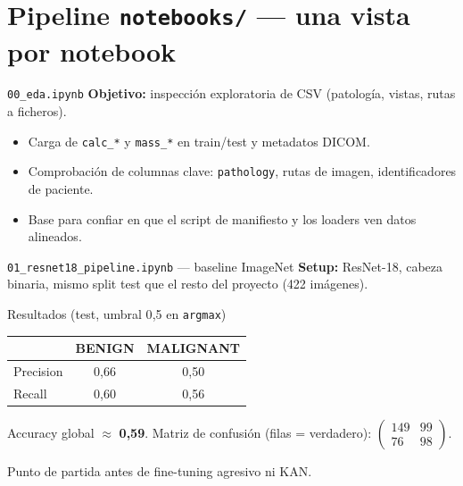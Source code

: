 \documentclass[aspectratio=169,spanish]{beamer}
\begin{document}
\section{Pipeline \texttt{notebooks/} — una vista por notebook}

\begin{frame}{\texttt{00\_eda.ipynb}}
  \textbf{Objetivo:} inspección exploratoria de CSV (patología, vistas, rutas a ficheros).
  \begin{itemize}
    \item Carga de \texttt{calc\_*} y \texttt{mass\_*} en train/test y metadatos DICOM.
    \item Comprobación de columnas clave: \texttt{pathology}, rutas de imagen, identificadores de paciente.
    \item Base para confiar en que el script de manifiesto y los loaders ven datos alineados.
  \end{itemize}
\end{frame}

\begin{frame}{\texttt{01\_resnet18\_pipeline.ipynb} — baseline ImageNet}
  \textbf{Setup:} ResNet-18, cabeza binaria, mismo split test que el resto del proyecto (422 imágenes).
  \begin{block}{Resultados (test, umbral 0{,}5 en \texttt{argmax})}
    \centering
    \small
    \begin{tabular}{@{}lcc@{}}
      \toprule
       & BENIGN & MALIGNANT \\
      \midrule
      Precision & 0{,}66 & 0{,}50 \\
      Recall    & 0{,}60 & 0{,}56 \\
      \bottomrule
    \end{tabular}

    \vspace{0.3em}
    Accuracy global $\approx$ \textbf{0{,}59}. Matriz de confusión (filas = verdadero): $\begin{pmatrix}149&99\\76&98\end{pmatrix}$.
  \end{block}
  Punto de partida antes de fine-tuning agresivo ni KAN.
\end{frame}
\end{document}
